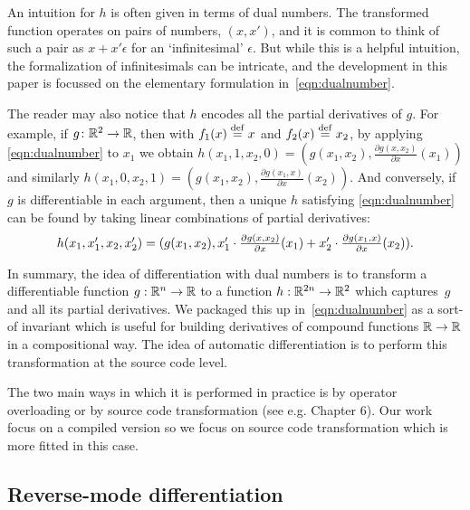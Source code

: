 An intuition for $h$ is often given in terms of dual numbers.
The transformed function operates on pairs of numbers, $(x,x')$, and it is common
to think of such a pair as $x+x'\epsilon$ for an `infinitesimal' $\epsilon$.
But while this is a helpful intuition, the formalization of infinitesimals can be intricate, 
and the development in this paper is focussed on the elementary formulation in~\eqref{eqn:dualnumber}. 

The reader may also notice that $h$ encodes all the partial derivatives of
$g$. For example, 
if $g \colon \mathbb{R}^2\to \mathbb{R}$, then with $f_1(x)\stackrel {\mathrm{def}}= x$ and $f_2(x)\stackrel {\mathrm{def}}= x_2$, by applying \eqref{eqn:dualnumber} to $x_1$ we obtain
$h(x_1,1,x_2,0)=(g(x_1,x_2), \frac {\partial g(x,x_2)}{\partial x}(x_1))$
and similarly 
$h(x_1,0,x_2,1)=(g(x_1,x_2), \frac {\partial g(x_1,x)}{\partial x}(x_2))$.
And conversely, if $g$ is differentiable in each argument, then
a unique $h$ satisfying \eqref{eqn:dualnumber} can be found by taking linear
combinations of partial derivatives:
\[\textstyle h(x_1,x_1',x_2,x_2')=(g(x_1,x_2),x_1' \cdot\frac {\partial g(x,x_2)}{\partial x}(x_1)+x_2'\cdot \frac {\partial g(x_1,x)}{\partial x}(x_2))\text.\]

In summary, the idea of differentiation with dual numbers is 
to transform a differentiable function
$g:\mathbb{R}^n\to \mathbb{R}$ to a function $h:\mathbb{R}^{2n}\to \mathbb{R}^2$ which captures~$g$ and all its partial derivatives. We packaged this up in~\eqref{eqn:dualnumber} as a sort-of invariant which is useful for building derivatives of compound functions $\mathbb{R}\to\mathbb{R}$ in a compositional way.
The idea of automatic differentiation is to perform this transformation at the source code level. 

The two main ways in which it is performed in practice is by operator overloading or by source code transformation (see e.g. \cite{griewank2008evaluating} Chapter 6). 
Our work focus on a compiled version so we focus on source code transformation which is more fitted in this case.

\subsection{Reverse-mode differentiation}

